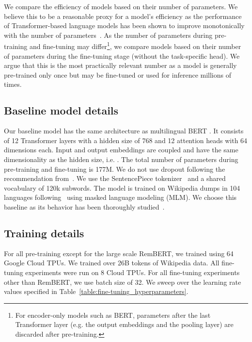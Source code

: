 \documentclass{article} \usepackage{iclr2021_conference,times}
\begin{document}
We compare the efficiency of models based on their number of parameters. We believe this to be a reasonable proxy for a model's efficiency as the performance of Transformer-based language models has been shown to improve monotonically with the number of parameters~\citep{Kaplan2020,Raffel2020,Lepikhin2020,Brown2020,Shoeybi2019,Aharoni2019m4}. As the number of parameters during pre-training and fine-tuning may differ\footnote{For encoder-only models such as BERT, parameters after the last Transformer layer (e.g. the output embeddings and the pooling layer) are discarded after pre-training.}, we compare models based on their number of parameters during the fine-tuning stage (without the task-specific head). We argue that this is the most practically relevant number as a model is generally pre-trained only once but may be fine-tuned or used for inference millions of times. 

\subsection{Baseline model details} \label{app:baseline_model}

Our baseline model has the same architecture as multilingual BERT \citep[mBERT;][]{Devlin2019}. It consists of 12 Transformer layers with a hidden size  of 768 and 12 attention heads with 64 dimensions each. Input and output embeddings are coupled and have the same dimensionality  as the hidden size, i.e. . The total number of parameters during pre-training and fine-tuning is 177M. We do not use dropout following the recommendation from~\citet{Lan2020}. We use the SentencePiece tokenizer~\citep{Kudo2018_SPM} and a shared vocabulary of 120k subwords. The model is trained on Wikipedia dumps in 104 languages following~\citet{Devlin2019} using masked language modeling (MLM). We choose this baseline as its behavior has been thoroughly studied~\citep{K2020,Conneau2020_emerging,Pires2019,Wu2019}. 


\subsection{Training details} \label{app:training_details}
For all pre-training except for the large scale RemBERT, we trained using 64 Google Cloud TPUs. We trained over 26B tokens of Wikipedia data. All fine-tuning experiments were run on 8 Cloud TPUs. For all fine-tuning experiments other than RemBERT, we use batch size of 32. We sweep over the learning rate values specified in Table~\ref{table:fine-tuning_hyperparameters}.
\end{document}
